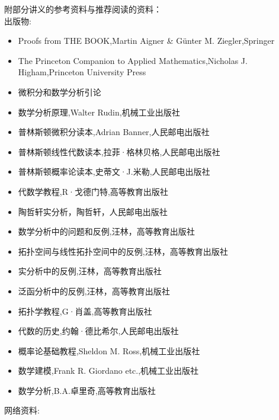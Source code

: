 \documentclass[12pt, a4paper, oneside]{ctexbook}
\begin{document}
\noindent
附部分讲义的参考资料与推荐阅读的资料：\\
出版物:
\begin{itemize}
  \item Proofs from THE BOOK,Martin Aigner \& Günter M. Ziegler,Springer
  \item The Princeton Companion to Applied Mathematics,Nicholas J. Higham,Princeton University Press
  \item 微积分和数学分析引论
  \item 数学分析原理,Walter Rudin,机械工业出版社
  \item 普林斯顿微积分读本,Adrian Banner,人民邮电出版社
  \item 普林斯顿线性代数读本,拉菲·格林贝格,人民邮电出版社
  \item 普林斯顿概率论读本,史蒂文·J.米勒,人民邮电出版社
  \item 代数学教程,R·戈德门特,高等教育出版社
  \item 陶哲轩实分析，陶哲轩，人民邮电出版社
  \item 数学分析中的问题和反例,汪林，高等教育出版社
  \item 拓扑空间与线性拓扑空间中的反例,汪林，高等教育出版社
  \item 实分析中的反例,汪林，高等教育出版社
  \item 泛函分析中的反例,汪林，高等教育出版社
  \item 拓扑学教程,G·肖盖,高等教育出版社
  \item 代数的历史,约翰·德比希尔,人民邮电出版社
  \item 概率论基础教程,Sheldon M. Ross,机械工业出版社
  \item 数学建模,Frank R. Giordano etc.,机械工业出版社
  \item 数学分析,B.A.卓里奇,高等教育出版社
\end{itemize}
网络资料:
\end{document}
